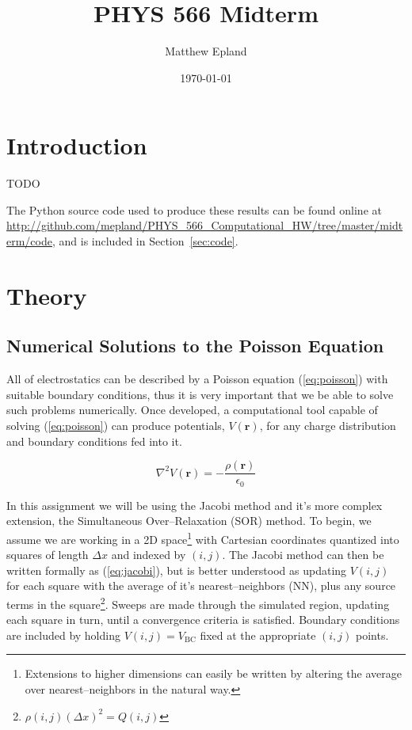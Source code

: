 \documentclass[notitlepage,aps,prd,nofootinbib]{revtex4-1}
\begin{document}
\title{PHYS 566 Midterm}
\author{Matthew Epland}

\date{\today}


\begin{abstract}
\end{abstract}\maketitle


\section{Introduction}
\label{sec:intro}
TODO

The Python source code used to produce these results can be found online at \url{http://github.com/mepland/PHYS_566_Computational_HW/tree/master/midterm/code}, and is included in Section~\ref{sec:code}.

\section{Theory}
\label{sec:theory}

\subsection{Numerical Solutions to the Poisson Equation}
\label{subsec:poisson_theory}
All of electrostatics can be described by a Poisson equation (\ref{eq:poisson}) with suitable boundary conditions, thus it is very important that we be able to solve such problems numerically. Once developed, a computational tool capable of solving (\ref{eq:poisson}) can produce potentials, $V\left(\mathbf{r}\right)$, for any charge distribution and boundary conditions fed into it.

\begin{equation} \label{eq:poisson}
\nabla^{2} V\left(\mathbf{r}\right) = -\frac{\rho\left(\mathbf{r}\right)}{\epsilon_{0}}
\end{equation}

In this assignment we will be using the Jacobi method and it's more complex extension, the Simultaneous Over--Relaxation (SOR) method. To begin, we assume we are working in a 2D space\footnote{Extensions to higher dimensions can easily be written by altering the average over nearest--neighbors in the natural way.} with Cartesian coordinates quantized into squares of length $\Delta x$ and indexed by $\left(i,j\right)$. The Jacobi method can then be written formally as (\ref{eq:jacobi}), but is better understood as updating $V\left(i,j\right)$ for each square with the average of it's nearest--neighbors (NN), plus any source terms in the square\footnote{$\rho\left(i,j\right)\left(\Delta x\right)^{2} = Q\left(i,j\right)$}. Sweeps are made through the simulated region, updating each square in turn, until a convergence criteria is satisfied. Boundary conditions are included by holding $V\left(i,j\right) = V_{\mathrm{BC}}$ fixed at the appropriate $\left(i,j\right)$ points.
\end{document}
